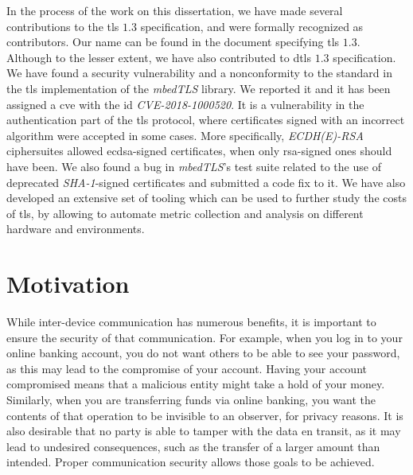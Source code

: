 In the process of the work on this dissertation, we have made several
contributions to the \gls{tls} $1.3$ specification, and were formally recognized as 
contributors\cite{Mergepul65:online}. Our name can be found in the document specifying \gls{tls} $1.3$\cite{RFC8446}.
Although to the lesser extent, we have also contributed to \gls{dtls} $1.3$ specification\cite{DTLS13:online}.
We have found a security vulnerability and a nonconformity to the standard in the
\gls{tls} implementation of the \textit{mbedTLS} library. We reported it and it
has been assigned a \gls{cve} with the id \textit{CVE-2018-1000520}\cite{NVDCVE2094:online}.
It is a vulnerability in the authentication part of the \gls{tls} protocol, where certificates signed with an incorrect algorithm
were accepted in some cases. More specifically, \textit{ECDH(E)-RSA} ciphersuites allowed \gls{ecdsa}-signed
certificates, when only \gls{rsa}-signed ones should have been. We also found a bug in \textit{mbedTLS}'s test suite
related to the use of deprecated \textit{SHA-1}-signed certificates and submitted a code fix to 
it\cite{sslserve89:onelin}\cite{updatete23:online}. We have also developed an extensive set of tooling which
can be used to further study the costs of \gls{tls}, by allowing to automate metric collection and analysis on
different hardware and environments.

\section{Motivation}
%

While inter-device communication has numerous benefits, it is important
to ensure the security of that communication. For example, when you log
in to your online banking account, you do not want others to be
able to see your password, as this may lead to the compromise of your
account. Having your account compromised means that a malicious entity
might take a hold of your money. Similarly, when you are transferring funds via
online banking, you want the contents of that operation to be
invisible to an observer, for privacy reasons. It is also desirable
that no party is able to tamper with the data en transit,
as it may lead to undesired consequences, such as the transfer of a
larger amount than intended. Proper communication security allows
those goals to be achieved.

